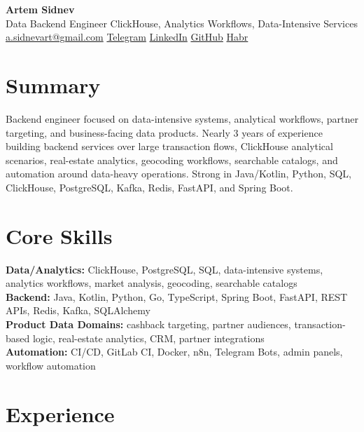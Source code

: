 \documentclass[10pt,a4paper]{article}
\begin{document}
\small

\begin{center}
{\LARGE \textbf{Artem Sidnev}}\\[0.18em]
{\normalsize Data Backend Engineer \textbar{} ClickHouse, Analytics Workflows, Data-Intensive Services}\\[0.32em]
{\footnotesize
\href{mailto:a.sidnevart@gmail.com}{a.sidnevart@gmail.com}
\enspace\textbar\enspace
\href{https://t.me/sidnevart}{Telegram}
\enspace\textbar\enspace
\href{https://www.linkedin.com/in/artem-sidnev}{LinkedIn}
\enspace\textbar\enspace
\href{https://github.com/sidnevart}{GitHub}
\enspace\textbar\enspace
\href{https://habr.com/ru/users/sidnevart}{Habr}
}
\end{center}

\section*{Summary}
Backend engineer focused on data-intensive systems, analytical workflows, partner targeting, and business-facing data products. Nearly 3 years of experience building backend services over large transaction flows, ClickHouse analytical scenarios, real-estate analytics, geocoding workflows, searchable catalogs, and automation around data-heavy operations. Strong in Java/Kotlin, Python, SQL, ClickHouse, PostgreSQL, Kafka, Redis, FastAPI, and Spring Boot.

\section*{Core Skills}
\textbf{Data/Analytics:} ClickHouse, PostgreSQL, SQL, data-intensive systems, analytics workflows, market analysis, geocoding, searchable catalogs \\
\textbf{Backend:} Java, Kotlin, Python, Go, TypeScript, Spring Boot, FastAPI, REST APIs, Redis, Kafka, SQLAlchemy \\
\textbf{Product Data Domains:} cashback targeting, partner audiences, transaction-based logic, real-estate analytics, CRM, partner integrations \\
\textbf{Automation:} CI/CD, GitLab CI, Docker, n8n, Telegram Bots, admin panels, workflow automation

\section*{Experience}
\end{document}
